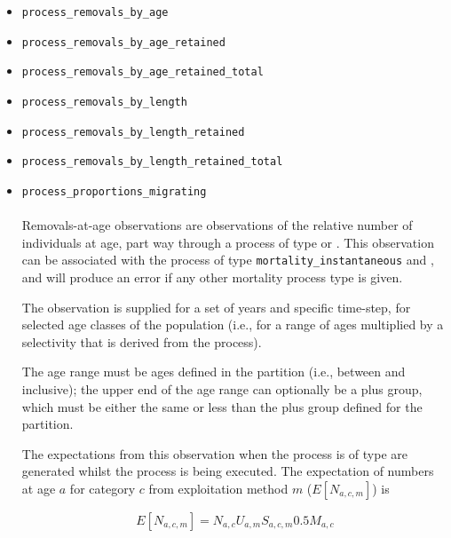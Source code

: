 \ifAgeBased
\begin{itemize}
	\item \texttt{process\_removals\_by\_age}
	\item \texttt{process\_removals\_by\_age\_retained}
	\item \texttt{process\_removals\_by\_age\_retained\_total}
	\item \texttt{process\_removals\_by\_length}
	\item \texttt{process\_removals\_by\_length\_retained}
	\item \texttt{process\_removals\_by\_length\_retained\_total}
	\item \texttt{process\_proportions\_migrating}
	
	\paragraph*{\label{sec:removals-by-age}}\label{sec:Observation-ProcessRemovalsByAge}
	
	Removals-at-age observations are observations of the relative number of individuals at age, part way through a process of type  or . This observation can be  associated with the process of type \texttt{mortality\_instantaneous} and , and will produce an error if any other mortality process type is given.
	
	The observation is supplied for a set of years and specific time-step, for selected age classes of the population (i.e., for a range of ages multiplied by a selectivity that is derived from the process).
	
	The age range must be ages defined in the partition (i.e., between  and  inclusive); the upper end of the age range can optionally be a plus group, which must be either the same or less than the plus group defined for the partition.
	
	The expectations from this observation when the process is of type  are generated whilst the process is being executed. The expectation of numbers at age $a$ for category $c$ from exploitation method $m$ ($E[N_{a,c,m}]$) is
	
	\begin{equation}
	E[N_{a,c,m}] = N_{a,c} U_{a,m} S_{a,c,m} 0.5 M_{a,c}
	\end{equation}
	

\end{itemize}
